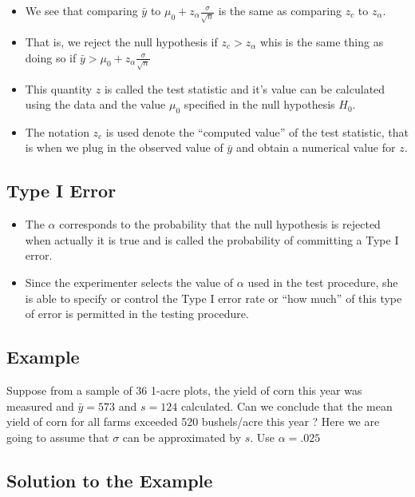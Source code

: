 \documentclass[
  letterpaper,
  DIV=11,
  numbers=noendperiod]{scrartcl}
\begin{document}
\begin{itemize}
\item
  We see that comparing \(\bar{y}\) to
  \(\mu_0 + z_\alpha \frac{\sigma}{\sqrt{n}}\) is the same as comparing
  \(z_c\) to \(z_\alpha\).
\item
  That is, we reject the null hypothesis if \(z_c > z_\alpha\) whis is
  the same thing as doing so if
  \(\bar{y} > \mu_0 + z_\alpha \frac{\sigma}{\sqrt{n}}\)
\item
  This quantity \(z\) is called the {test statistic} and it's value can
  be calculated using the data and the value \(\mu_0\) specified in the
  null hypothesis \(H_0\).
\item
  The notation \(z_c\) is used denote the ``computed value'' of the test
  statistic, that is when we plug in the observed value of \(\bar{y}\)
  and obtain a numerical value for \(z\).
\end{itemize}

\subsection{Type I Error}\label{type-i-error}

\begin{itemize}
\item
  The \(\alpha\) corresponds to the probability that the null hypothesis
  is rejected when actually it is true and is called the probability of
  committing a {Type I error}.
\item
  Since the experimenter selects the value of \(\alpha\) used in the
  test procedure, she is able to specify or {control} the Type I error
  rate or ``how much'' of this type of error is permitted in the testing
  procedure.
\end{itemize}

\subsection{Example}\label{example-2}

Suppose from a sample of 36 1-acre plots, the yield of corn this year
was measured and \(\bar{y}=573\) and \(s=124\) calculated. Can we
conclude that the mean yield of corn for all farms exceeded 520
bushels/acre this year ? Here we are going to assume that \(\sigma\) can
be approximated by \(s\). Use \(\alpha=.025\)\\

\subsection{Solution to the Example}\label{solution-to-the-example}
\end{document}
